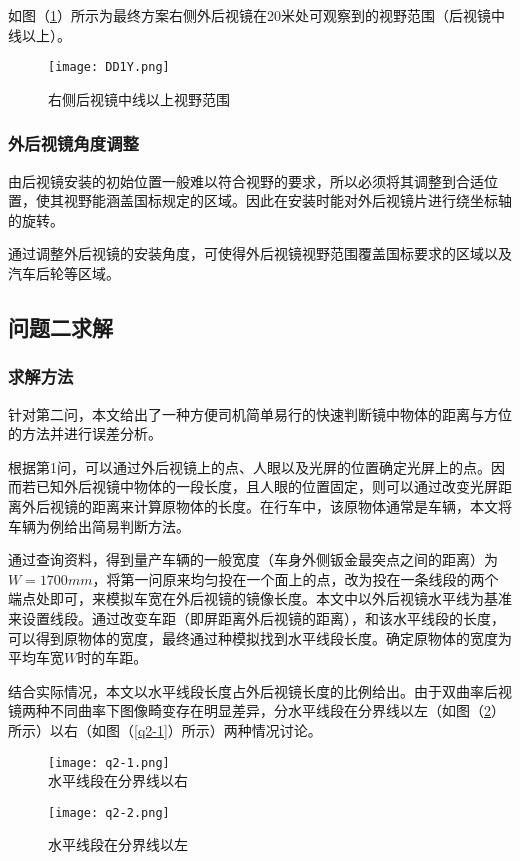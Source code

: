 \documentclass[withoutpreface,bwprint]{cumcmthesis} %
\begin{document}
\par 如图（\ref{fig:DD1Y}）所示为最终方案右侧外后视镜在20米处可观察到的视野范围（后视镜中线以上）。

\begin{figure}[!htbp]
\small
\centering
\texttt{[image: DD1Y.png]}
\caption{右侧后视镜中线以上视野范围} \label{fig:DD1Y}
\end{figure}

 
\subsubsection{外后视镜角度调整}
\par 由后视镜安装的初始位置一般难以符合视野的要求，所以必须将其调整到合适位置，使其视野能涵盖国标规定的区域。因此在安装时能对外后视镜片进行绕坐标轴的旋转。

\par 通过调整外后视镜的安装角度，可使得外后视镜视野范围覆盖国标要求的区域以及汽车后轮等区域。
 
\subsection{问题二求解}
\subsubsection{求解方法}
\par 针对第二问，本文给出了一种方便司机简单易行的快速判断镜中物体的距离与方位的方法并进行误差分析。
\par 根据第1问，可以通过外后视镜上的点、人眼以及光屏的位置确定光屏上的点。因而若已知外后视镜中物体的一段长度，且人眼的位置固定，则可以通过改变光屏距离外后视镜的距离来计算原物体的长度。在行车中，该原物体通常是车辆，本文将车辆为例给出简易判断方法。
\par 通过查询资料，得到量产车辆的一般宽度（车身外侧钣金最突点之间的距离）为$W=1700mm$，将第一问原来均匀投在一个面上的点，改为投在一条线段的两个端点处即可，来模拟车宽在外后视镜的镜像长度。本文中以外后视镜水平线为基准来设置线段。通过改变车距（即屏距离外后视镜的距离），和该水平线段的长度，可以得到原物体的宽度，最终通过种模拟找到水平线段长度。确定原物体的宽度为平均车宽$W$时的车距。
\par 结合实际情况，本文以水平线段长度占外后视镜长度的比例给出。由于双曲率后视镜两种不同曲率下图像畸变存在明显差异，分水平线段在分界线以左（如图（\ref{q2-2}）所示）以右（如图（\ref{q2-1}）所示）两种情况讨论。

\begin{figure}[!htbp]  
\begin{minipage}[t]{0.5\textwidth}
\centering  
\texttt{[image: q2-1.png]} \\
\caption{水平线段在分界线以右} \label{q2-1}
\end{minipage}
\hspace{1ex}
\begin{minipage}[t]{0.5\textwidth}  
\centering  
\texttt{[image: q2-2.png]}\\
\caption{水平线段在分界线以左}  \label{q2-2}
\end{minipage}  
\end{figure} 
\end{document}
